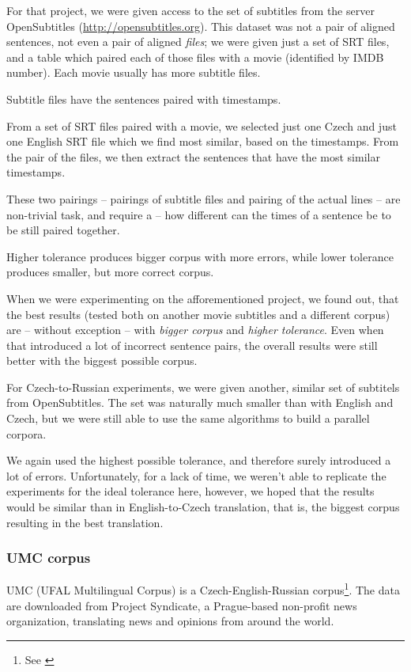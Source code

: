 For that project, we were given access to the set of subtitles from the server OpenSubtitles (\url{http://opensubtitles.org}). This dataset was not a pair of aligned sentences, not even a pair of aligned \emph{files}; we were given just a set of SRT files, and a table which paired each of those files with a movie (identified by IMDB number). Each movie usually has more subtitle files.

Subtitle files have the sentences paired with timestamps.

From a set of SRT files paired with a movie, we selected just one Czech and just one English SRT file which we find most similar, based on the timestamps.
From the pair of the files, we then extract the sentences that have the most similar timestamps.

These two pairings -- pairings of subtitle files and pairing of the actual lines -- are non-trivial task, and require a  -- how different can the times of a sentence be to be still paired together.

Higher tolerance produces bigger corpus with more errors, while lower tolerance produces smaller, but more correct corpus.

When we were experimenting on the afforementioned project, we found out, that the best results (tested both on another movie subtitles and a different corpus) are -- without exception -- with \emph{bigger corpus} and \emph{higher tolerance}. Even when that introduced a lot of incorrect sentence pairs, the overall results were still better with the biggest possible corpus.

For Czech-to-Russian experiments, we were given another, similar set of subtitels from OpenSubtitles. The set was naturally much smaller than with English and Czech, but we were still able to use the same algorithms to build a parallel corpora.

We again used the highest possible tolerance, and therefore surely introduced a lot of errors. Unfortunately, for a lack of time, we weren't able to replicate the experiments for the ideal tolerance here, however, we hoped that the results would be similar than in English-to-Czech translation, that is, the biggest corpus resulting in the best translation.

\subsubsection{UMC corpus}
UMC (UFAL Multilingual Corpus) is a Czech-English-Russian corpus\footnote{See \cite{umc}}. The data are downloaded from Project Syndicate, a Prague-based non-profit news organization, translating news and opinions from around the world.

